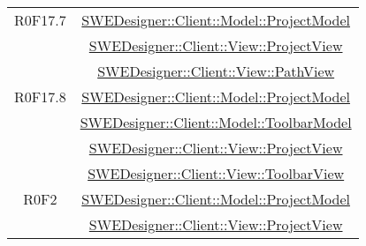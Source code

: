\documentclass[../DefinizioneDiProdotto.tex]{subfiles}
\begin{document}
\begin{longtable}{|c|c|}
				R0F17.7
				& \hyperlink{SWEDesigner::Client::Model::ProjectModel}{SWEDesigner::Client::Model::ProjectModel}\\
				& \hyperlink{SWEDesigner::Client::View::ProjectView}{SWEDesigner::Client::View::ProjectView}\\
				& \hyperlink{SWEDesigner::Client::View::PathView}{SWEDesigner::Client::View::PathView}\\
				\hline

				R0F17.8
				& \hyperlink{SWEDesigner::Client::Model::ProjectModel}{SWEDesigner::Client::Model::ProjectModel}\\
				& \hyperlink{SWEDesigner::Client::Model::ToolbarModel}{SWEDesigner::Client::Model::ToolbarModel}\\
				& \hyperlink{SWEDesigner::Client::View::ProjectView}{SWEDesigner::Client::View::ProjectView}\\
				& \hyperlink{SWEDesigner::Client::View::ToolbarView}{SWEDesigner::Client::View::ToolbarView}\\
				\hline

				R0F2
				& \hyperlink{SWEDesigner::Client::Model::ProjectModel}{SWEDesigner::Client::Model::ProjectModel}\\
				& \hyperlink{SWEDesigner::Client::View::ProjectView}{SWEDesigner::Client::View::ProjectView}\\
				\hline


\end{longtable}
\end{document}
